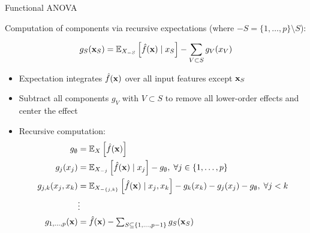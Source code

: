 \documentclass[11pt,compress,t,notes=noshow, aspectratio=169, xcolor=table]{beamer}
\newcommand{\open}{}
\newcommand{\close}{}
\begin{document}
\begin{frame}{Functional ANOVA}

Computation of components via recursive expectations (where $-S = \{1, \ldots, p \} \setminus S$):

$$g_{S}(\xv_S) = \mathbb{E}_{X_{-S}}\left[\fh(\xv) \; \vert  \; x_S \right] - \sum_{V \subset S} g_V(x_V)$$

\begin{itemize}
    \item Expectation integrates $\fh(\xv)$ over all input features except $\xv_S$
    \item Subtract all components $g_V$ with $V \subset S$ to remove all lower-order effects and center the effect
\item Recursive computation:
\begin{align*}
 g_{\open \emptyset \close} &= \mathbb{E}_X\left[\fh(\xv)\right] \\
 g_{\open j \close}(x_j) &= \mathbb{E}_{X_{-j}}\left[\fh(\xv) \; \vert  \; x_j \right] - g_{\open \emptyset \close}, \; \forall j \in \{1, \ldots, p\} \\%
 g_{\open j, k \close}(x_j, x_k) &= \mathbb{E}_{X_{-\{ j,k \}}}\left[\fh(\xv) \; \vert \; x_j, x_k \right] - g_{\open k \close}(x_k) - g_{\open j \close}(x_j) - g_{\open \emptyset \close}, \; \forall j < k\\%
 &\vdots \\
 g_{\open 1, \dots, p \close}(\xv) &= \fh(\xv) - \textstyle\sum_{S \subseteq \{1,\ldots,p-1\}} g_{S}(\xv_S) 
\end{align*}

\end{itemize}

\end{frame}
\end{document}
